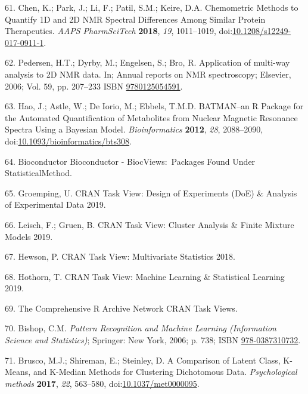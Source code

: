\documentclass[]{article}
\begin{document}
\leavevmode\hypertarget{ref-chen_2018}{}%
61. Chen, K.; Park, J.; Li, F.; Patil, S.M.; Keire, D.A. Chemometric Methods to Quantify 1D and 2D NMR Spectral Differences Among Similar Protein Therapeutics. \emph{AAPS PharmSciTech} \textbf{2018}, \emph{19}, 1011--1019, doi:\href{https://doi.org/10.1208/s12249-017-0911-1}{10.1208/s12249-017-0911-1}.

\leavevmode\hypertarget{ref-pedersen_2006}{}%
62. Pedersen, H.T.; Dyrby, M.; Engelsen, S.; Bro, R. Application of multi-way analysis to 2D NMR data. In; Annual reports on NMR spectroscopy; Elsevier, 2006; Vol. 59, pp. 207--233 ISBN \href{https://worldcat.org/isbn/9780125054591}{9780125054591}.

\leavevmode\hypertarget{ref-hao_2012}{}%
63. Hao, J.; Astle, W.; De Iorio, M.; Ebbels, T.M.D. BATMAN--an R Package for the Automated Quantification of Metabolites from Nuclear Magnetic Resonance Spectra Using a Bayesian Model. \emph{Bioinformatics} \textbf{2012}, \emph{28}, 2088--2090, doi:\href{https://doi.org/10.1093/bioinformatics/bts308}{10.1093/bioinformatics/bts308}.

\leavevmode\hypertarget{ref-bioconductor_website_ndb}{}%
64. Bioconductor Bioconductor - BiocViews:~Packages Found Under StatisticalMethod.

\leavevmode\hypertarget{ref-groemping_website_2019}{}%
65. Groemping, U. CRAN Task View: Design of Experiments (DoE) \& Analysis of Experimental Data 2019.

\leavevmode\hypertarget{ref-leisch_website_2019}{}%
66. Leisch, F.; Gruen, B. CRAN Task View: Cluster Analysis \& Finite Mixture Models 2019.

\leavevmode\hypertarget{ref-hewson_website_2018}{}%
67. Hewson, P. CRAN Task View: Multivariate Statistics 2018.

\leavevmode\hypertarget{ref-hothorn_website_2019}{}%
68. Hothorn, T. CRAN Task View: Machine Learning \& Statistical Learning 2019.

\leavevmode\hypertarget{ref-thecomprehensiverarchivenetwork_website_nda}{}%
69. The Comprehensive R Archive Network CRAN Task Views.

\leavevmode\hypertarget{ref-bishop_2006}{}%
70. Bishop, C.M. \emph{Pattern Recognition and Machine Learning (Information Science and Statistics)}; Springer: New York, 2006; p. 738; ISBN \href{https://worldcat.org/isbn/978-0387310732}{978-0387310732}.

\leavevmode\hypertarget{ref-brusco_2017}{}%
71. Brusco, M.J.; Shireman, E.; Steinley, D. A Comparison of Latent Class, K-Means, and K-Median Methods for Clustering Dichotomous Data. \emph{Psychological methods} \textbf{2017}, \emph{22}, 563--580, doi:\href{https://doi.org/10.1037/met0000095}{10.1037/met0000095}.
\end{document}
